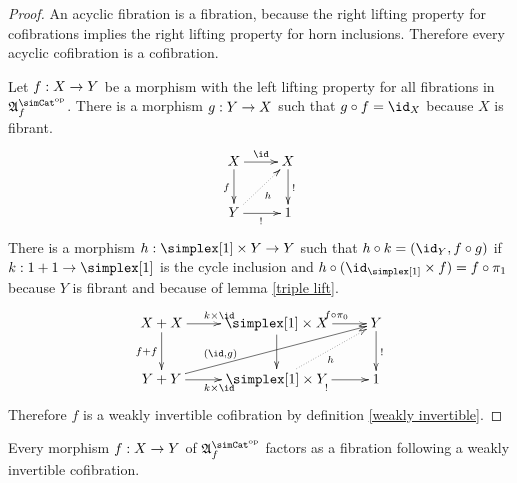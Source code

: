 \documentclass[csh.tex]{subfiles}
\begin{document}
\begin{proof} An acyclic fibration is a fibration, because the right lifting property for cofibrations implies the right lifting property for horn inclusions. Therefore every acyclic cofibration is a cofibration.

Let $f: X\to Y$ be a morphism with the left lifting property for all fibrations in $\ambient\s\f$. There is a morphism $g: Y\to X$ such that $g\circ f = \id_X$ because $X$ is fibrant. 
\[ \xymatrix{
X\ar[d]_f \ar[r]^\id & X\ar[d]^\bang\\
Y\ar[r]_\bang \ar@{.>}[ur]_h & 1
}\]
There is a morphism $h\of \simplex[1]\times Y\to Y$ such that $h\circ k = (\id_Y,f\circ g)$ if $k\of 1+1\to\simplex[1]$ is the cycle inclusion and $h\circ (\id_{\simplex[1]}\times f) = f\circ\pi_1$ because $Y$ is fibrant and because of lemma \ref{triple lift}.
\[ \xymatrix{
X+X\ar[d]_{f+f}\ar[r]^{k\times\id} & \simplex[1]\times X \ar[r]^(.6){f\circ \pi_0}\ar[d] & Y\ar[d]^\bang\\
Y+Y\ar[r]_{k\times\id} \ar[urr]^(.3){(\id,g)} & \simplex[1]\times Y \ar[r]_\bang\ar@{.>}[ur]_h & 1
}\]
Therefore $f$ is a weakly invertible cofibration by definition \ref{weakly invertible}.
\end{proof}

\begin{proposition} Every morphism $f: X\to Y$ of $\ambient\s\f$ factors as a fibration following a weakly invertible cofibration. \label{factor2} \end{proposition}
\end{document}
